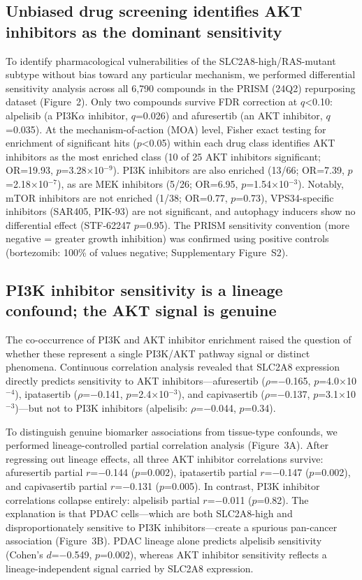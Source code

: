 \documentclass[12pt]{article}
\begin{document}
\subsection{Unbiased drug screening identifies AKT inhibitors as the
dominant sensitivity}

To identify pharmacological vulnerabilities of the SLC2A8-high/RAS-mutant
subtype without bias toward any particular mechanism, we performed
differential sensitivity analysis across all 6,790 compounds in the
PRISM (24Q2) repurposing dataset (Figure~2). Only two compounds survive
FDR correction at $q$<0.10: alpelisib (a PI3K$\alpha$ inhibitor,
$q$=0.026) and afuresertib (an AKT inhibitor,
$q$=0.035). At the mechanism-of-action (MOA) level,
Fisher exact testing for enrichment of significant hits ($p$<0.05)
within each drug class identifies AKT inhibitors as the most enriched
class (10 of 25 AKT inhibitors significant; OR=19.93,
$p$=3.28$\times$10$^{-9}$). PI3K inhibitors are also enriched (13/66;
OR=7.39, $p$=2.18$\times$10$^{-7}$), as are MEK inhibitors (5/26;
OR=6.95, $p$=1.54$\times$10$^{-3}$). Notably, mTOR inhibitors are not
enriched (1/38; OR=0.77, $p$=0.73), VPS34-specific inhibitors (SAR405,
PIK-93) are not significant, and autophagy inducers show no differential
effect (STF-62247 $p$=0.95). The PRISM sensitivity convention (more
negative = greater growth inhibition) was confirmed using positive
controls (bortezomib: 100\% of values negative; Supplementary Figure~S2).

\subsection{PI3K inhibitor sensitivity is a lineage confound; the AKT
signal is genuine}

The co-occurrence of PI3K and AKT inhibitor enrichment raised the
question of whether these represent a single PI3K/AKT pathway signal or
distinct phenomena. Continuous correlation analysis revealed that SLC2A8
expression directly predicts sensitivity to AKT inhibitors---afuresertib
($\rho$=$-$0.165, $p$=4.0$\times$10$^{-4}$), ipatasertib
($\rho$=$-$0.141, $p$=2.4$\times$10$^{-3}$), and capivasertib
($\rho$=$-$0.137, $p$=3.1$\times$10$^{-3}$)---but not to PI3K
inhibitors (alpelisib: $\rho$=$-$0.044, $p$=0.34).

To distinguish genuine biomarker associations from tissue-type confounds,
we performed lineage-controlled partial correlation analysis
(Figure~3A). After regressing out lineage effects, all three AKT
inhibitor correlations survive: afuresertib partial $r$=$-$0.144
($p$=0.002), ipatasertib partial $r$=$-$0.147 ($p$=0.002), and
capivasertib partial $r$=$-$0.131 ($p$=0.005). In contrast, PI3K
inhibitor correlations collapse entirely: alpelisib partial $r$=$-$0.011
($p$=0.82). The explanation is that PDAC cells---which are both
SLC2A8-high and disproportionately sensitive to PI3K inhibitors---create
a spurious pan-cancer association (Figure~3B). PDAC lineage alone predicts
alpelisib sensitivity (Cohen's $d$=$-$0.549, $p$=0.002), whereas
AKT inhibitor sensitivity reflects a lineage-independent signal carried
by SLC2A8 expression.
\end{document}

